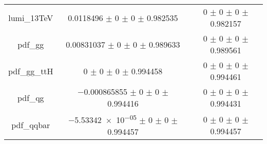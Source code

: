 \begin{table}
\begin{tabular}{ccc}
lumi\_13TeV & \num{0.0118496} $\pm$ \num{0} $\pm$ \num{0} $\pm$ \num{0.982535} & \num{0} $\pm$ \num{0} $\pm$ \num{0} $\pm$ \num{0.982157}\\
pdf\_gg & \num{0.00831037} $\pm$ \num{0} $\pm$ \num{0} $\pm$ \num{0.989633} & \num{0} $\pm$ \num{0} $\pm$ \num{0} $\pm$ \num{0.989561}\\
pdf\_gg\_ttH & \num{0} $\pm$ \num{0} $\pm$ \num{0} $\pm$ \num{0.994458} & \num{0} $\pm$ \num{0} $\pm$ \num{0} $\pm$ \num{0.994461}\\
pdf\_qg & \num{-0.000865855} $\pm$ \num{0} $\pm$ \num{0} $\pm$ \num{0.994416} & \num{0} $\pm$ \num{0} $\pm$ \num{0} $\pm$ \num{0.994431}\\
pdf\_qqbar & \num{-5.53342e-05} $\pm$ \num{0} $\pm$ \num{0} $\pm$ \num{0.994457} & \num{0} $\pm$ \num{0} $\pm$ \num{0} $\pm$ \num{0.994457}\\
\bottomrule
\end{tabular}
\end{table}